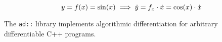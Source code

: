 \documentclass[english]{lecture}
\begin{document}
    \begin{example}
        \[
            y = f\parentheses*{x} = \sin\parentheses*{x} \implies \dot{y} = f_x \cdot \dot{x} = \cos\parentheses*{x} \cdot \dot{x}
        \]
    \end{example}

    The \texttt{ad::} library implements algorithmic differentiation for arbitrary differentiable C++ programs.
\end{document}
